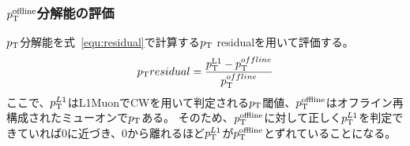 \subsubsection{$p_{\rm{T}}^{\rm{offline}}$分解能の評価}\label{分解能の評価}
$p_{\rm{T}}$分解能を式~\eqref{equ:residual}で計算する$p_{\rm{T}}$ residualを用いて評価する。
\begin{equation}
    p_{\rm{T}} residual = \frac{p_{\rm{T}}^{\rm{L1}}-p_{\rm{T}}^{offline}}{p_{\rm{T}}^{offline}}
    \label{equ:residual}
\end{equation}
ここで、$p_{\rm{T}}^{L1}$はL1MuonでCWを用いて判定される$p_{\rm{T}}$閾値、$p_{\rm{T}}^{\rm{offline}}$はオフライン再構成されたミューオンで$p_{\rm{T}}$ある。
そのため、$p_{\rm{T}}^{\rm{offline}}$に対して正しく$p_{\rm{T}}^{L1}$を判定できていれば0に近づき、0から離れるほど$p_{\rm{T}}^{L1}$が$p_{\rm{T}}^{\rm{offline}}$とずれていることになる。


